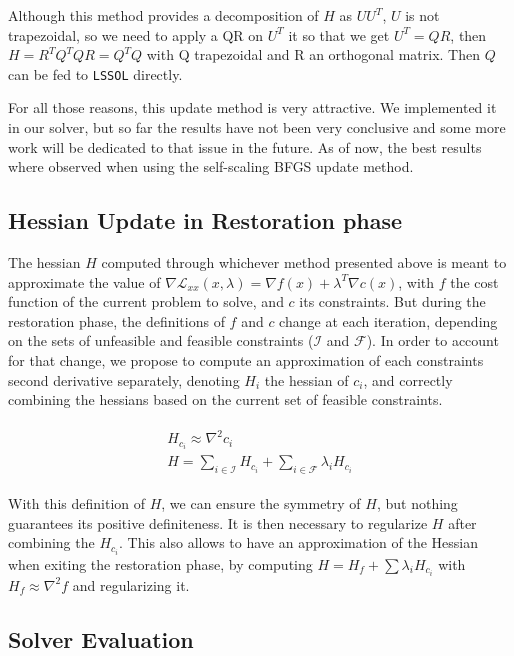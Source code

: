 Although this method provides a decomposition of $H$ as $U U^T$, $U$ is not trapezoidal, so we need to apply a QR on $U^T$ it so that we get $U^T=QR$, then $H=R^T Q^T Q R=Q^T Q$ with Q trapezoidal and R an orthogonal matrix.
Then $Q$ can be fed to {\tt LSSOL} directly.

For all those reasons, this update method is very attractive.
We implemented it in our solver, but so far the results have not been very conclusive and some more work will be dedicated to that issue in the future.
As of now, the best results where observed when using the self-scaling BFGS update method.

\subsection{Hessian Update in Restoration phase}
\label{sub:hessian_update_in_restoration_phase}

The hessian $H$ computed through whichever method presented above is meant to approximate the value of $\nabla \mathcal{L}_{xx}(x,\lambda) = \nabla f(x) + \lambda^T \nabla c(x)$, with $f$ the cost function of the current problem to solve, and $c$ its constraints.
But during the restoration phase, the definitions of $f$ and $c$ change at each iteration, depending on the sets of unfeasible and feasible constraints ($\mathcal{I}$ and $\mathcal{F}$).
In order to account for that change, we propose to compute an approximation of each constraints second derivative separately, denoting $H_i$ the hessian of $c_i$, and correctly combining the hessians based on the current set of feasible constraints.

\begin{align}
  \begin{split}
    H_{c_i} \approx \nabla^2 c_i\\
    H = \sum_{i\in \mathcal{I}}H_{c_i} + \sum_{i\in \mathcal{F}}\lambda_i H_{c_i}
  \end{split}
\end{align}

With this definition of $H$, we can ensure the symmetry of $H$, but nothing guarantees its positive definiteness.
It is then necessary to regularize $H$ after combining the $H_{c_i}$.
This also allows to have an approximation of the Hessian when exiting the restoration phase, by computing $H = H_f + \sum \lambda_i H_{c_i}$ with $H_f \approx \nabla^2 f$ and regularizing it.

\subsection{Solver Evaluation}
\label{sub:solver_evaluation}

